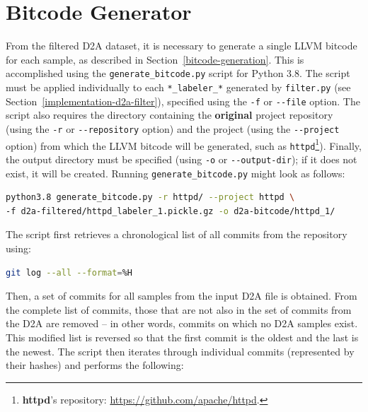 \section{Bitcode Generator}
\label{implementation-bitcode-generator}
From the filtered D2A dataset, it is necessary to generate a single LLVM bitcode for each sample, as described in Section~\ref{bitcode-generation}. This is accomplished using the \texttt{generate\_bitcode.py} script for Python 3.8. The script must be applied individually to each \texttt{*\_labeler\_*} generated by \texttt{filter.py} (see Section~\ref{implementation-d2a-filter}), specified using the \texttt{-f} or \texttt{-{}-file} option. The script also requires the directory containing the \textbf{original} project repository (using the \texttt{-r} or \texttt{-{}-repository} option) and the project (using the \texttt{-{}-project} option) from which the LLVM bitcode will be generated, such as \texttt{httpd}\footnote{\textbf{httpd}'s repository: \url{https://github.com/apache/httpd}.}). Finally, the output directory must be specified (using \texttt{-o} or \texttt{-{}-output-dir}); if it does not exist, it will be created. Running \texttt{generate\_bitcode.py} might look as follows:
\begin{lstlisting}[language=bash, xleftmargin=2em]
python3.8 generate_bitcode.py -r httpd/ --project httpd \
-f d2a-filtered/httpd_labeler_1.pickle.gz -o d2a-bitcode/httpd_1/
\end{lstlisting}

The script first retrieves a chronological list of all commits from the repository using:
\begin{lstlisting}[language=bash, xleftmargin=2em]
git log --all --format=%H
\end{lstlisting}

Then, a set of commits for all samples from the input D2A file is obtained. From the complete list of commits, those that are not also in the set of commits from the D2A are removed -- in other words, commits on which no D2A samples exist. This modified list is reversed so that the first commit is the oldest and the last is the newest. The script then iterates through individual commits (represented by their hashes) and performs the following:

